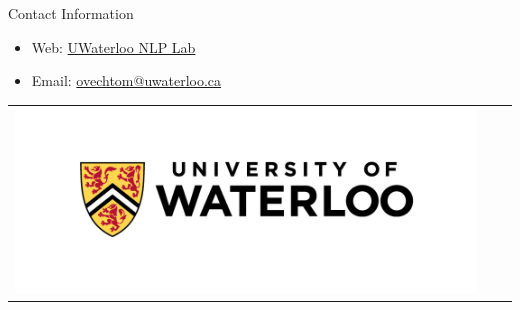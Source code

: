 \documentclass[final]{beamer}
\newlength{\onecolwid}
\begin{document}
\begin{frame}[t]
\begin{columns}[t]
\begin{column}{\onecolwid}


            \begin{alertblock}{Contact Information}

                \begin{itemize}
                    \item Web: \href{https://ov-research.uwaterloo.ca/NLP_lab.html}{UWaterloo NLP Lab}
                    \item Email: \href{mailto:ovechtom@uwaterloo.ca}{ovechtom@uwaterloo.ca}
                \end{itemize}

            \end{alertblock}

            \begin{center}
                \begin{tabular}{ccc}
                    \includegraphics[width=0.4\linewidth]{uwaterloo-logo.png}
                \end{tabular}
            \end{center}


        \end{column} %

    \end{columns} %

\end{frame} %
\end{document}
